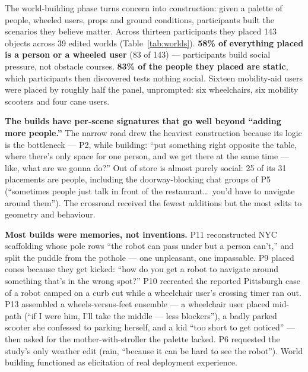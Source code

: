 The world-building phase turns concern into construction: given a
palette of people, wheeled users, props and ground conditions,
participants built the scenarios they believe matter. Across thirteen
participants they placed 143 objects across 39 edited worlds
(Table~\ref{tab:worlds}). \textbf{58\% of everything placed is a person
or a wheeled user} (83 of 143) --- participants build social pressure,
not obstacle courses. \textbf{83\% of the people they placed are
static}, which participants then discovered tests nothing social.
Sixteen mobility-aid users were placed by roughly half the panel,
unprompted: six wheelchairs, six mobility scooters and four cane users.

\textbf{The builds have per-scene signatures that go well beyond
``adding more people.''} The narrow road drew the heaviest
construction because its logic is the bottleneck --- P2, while
building: ``put something right opposite the table, where there's only
space for one person, and we get there at the same time --- like, what
are we gonna do?'' Out of store is almost purely social: 25 of its 31
placements are people, including the doorway-blocking chat groups of P5
(``sometimes people just talk in front of the restaurant\dots\ you'd
have to navigate around them''). The crossroad received the fewest
additions but the most edits to geometry and behaviour.

\textbf{Most builds were memories, not inventions.} P11 reconstructed
NYC scaffolding whose pole rows ``the robot can pass under but a person
can't,'' and split the puddle from the pothole --- one unpleasant, one
impassable. P9 placed cones because they get kicked: ``how do you get a
robot to navigate around something that's in the wrong spot?'' P10
recreated the reported Pittsburgh case of a robot camped on a curb cut
while a wheelchair user's crossing timer ran out. P13 assembled a
wheels-versus-feet ensemble --- a wheelchair user placed mid-path (``if
I were him, I'll take the middle --- less blockers''), a badly parked
scooter she confessed to parking herself, and a kid ``too short to get
noticed'' --- then asked for the mother-with-stroller the palette
lacked. P6 requested the study's only weather edit (rain, ``because it
can be hard to see the robot''). World building functioned as
elicitation of real deployment experience.

